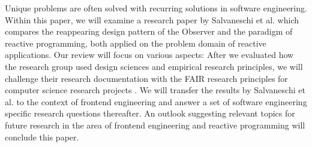 Unique problems are often solved with recurring solutions in software engineering. Within this paper, we will examine a research paper by Salvaneschi et al. \cite{7827078} which compares the reappearing design pattern of the Observer \cite{gamma1995design} and the paradigm of reactive programming, both applied on the problem domain of reactive applications. Our review will focus on various aspects: After we evaluated how the research group used design sciences \cite{wieringa} and empirical research principles, we will challenge their research documentation with the FAIR research principles \cite{wilkinson:2016} for computer science research projects \cite{2019arXiv190805986H}. We will transfer the results by Salvaneschi et al. to the context of frontend engineering and answer a set of software engineering specific research questions thereafter. An outlook suggesting relevant topics for future research in the area of frontend engineering and reactive programming will conclude this paper.